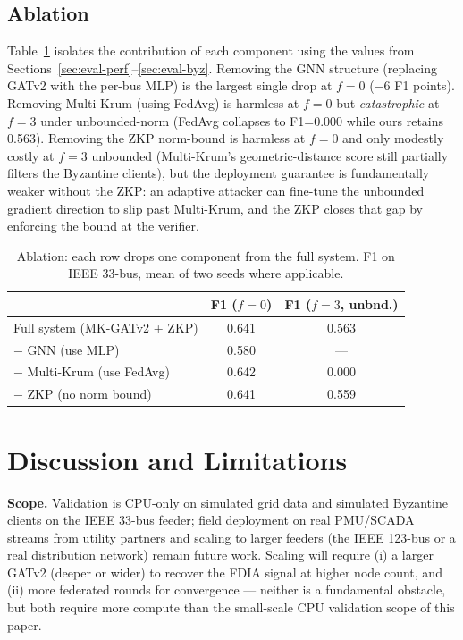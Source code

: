\documentclass[conference]{IEEEtran}
\begin{document}
\subsection{Ablation}
\label{sec:eval-ablation}
Table~\ref{tab:abl} isolates the contribution of each component using the values from Sections~\ref{sec:eval-perf}--\ref{sec:eval-byz}. Removing the GNN structure (replacing GATv2 with the per-bus MLP) is the largest single drop at $f=0$ ($-6$ F1 points). Removing Multi-Krum (using FedAvg) is harmless at $f=0$ but \emph{catastrophic} at $f=3$ under unbounded-norm (FedAvg collapses to F1=0.000 while ours retains 0.563). Removing the ZKP norm-bound is harmless at $f=0$ and only modestly costly at $f=3$ unbounded (Multi-Krum's geometric-distance score still partially filters the Byzantine clients), but the deployment guarantee is fundamentally weaker without the ZKP: an adaptive attacker can fine-tune the unbounded gradient direction to slip past Multi-Krum, and the ZKP closes that gap by enforcing the bound at the verifier.

\begin{table}[t]
\centering
\caption{Ablation: each row drops one component from the full system. F1 on IEEE 33-bus, mean of two seeds where applicable.}
\label{tab:abl}
\renewcommand{\arraystretch}{1.05}
\setlength{\tabcolsep}{4pt}
\begin{tabular}{lcc}
\toprule
& \textbf{F1 ($f{=}0$)} & \textbf{F1 ($f{=}3$, unbnd.)} \\
\midrule
Full system (MK-GATv2 + ZKP)  & 0.641 & 0.563 \\
$-$ GNN (use MLP)             & 0.580 & --- \\
$-$ Multi-Krum (use FedAvg)   & 0.642 & 0.000 \\
$-$ ZKP (no norm bound)       & 0.641 & 0.559 \\
\bottomrule
\end{tabular}
\end{table}

\section{Discussion and Limitations}
\label{sec:disc}
\textbf{Scope.} Validation is CPU-only on simulated grid data and simulated Byzantine clients on the IEEE 33-bus feeder; field deployment on real PMU/SCADA streams from utility partners and scaling to larger feeders (the IEEE 123-bus or a real distribution network) remain future work. Scaling will require (i) a larger GATv2 (deeper or wider) to recover the FDIA signal at higher node count, and (ii) more federated rounds for convergence — neither is a fundamental obstacle, but both require more compute than the small-scale CPU validation scope of this paper.
\end{document}

